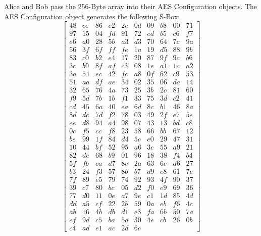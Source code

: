 \documentclass[journal]{IEEEtran}
\begin{document}
Alice and Bob pass the 256-Byte array into their AES Configuration objects. The AES Configuration object generates the following S-Box:
$$
\begin{bmatrix} 
48 & ce & 86 & e2 & 2e & 0d & 09 & b8 & 00 & 71 \\
97 & 15 & 04 & fd & 91 & 72 & ed & b5 & c6 & f7 \\
e6 & a0 & 28 & 5b & a3 & d3 & 70 & 64 & 7c & 9a \\
56 & 3f & 6f & ff & fe & 1a & 19 & d5 & 88 & 9b \\
83 & c0 & b2 & e4 & 17 & 20 & 87 & 9f & 9c & b6 \\
3c & b0 & 8f & af & c3 & 08 & 1e & a1 & 1c & a2 \\
3a & 54 & ec & 42 & fc & a8 & 0f & 62 & c9 & 53 \\
51 & aa & df & ae & 34 & 02 & 35 & 06 & da & 14 \\
32 & 65 & 76 & 4a & 73 & 25 & 3b & 2c & 81 & 60 \\
f9 & 5d & 7b & 1b & f1 & 33 & 75 & 3d & c2 & 41 \\
cd & 45 & 6a & 40 & ea & 6d & 8c & b1 & 46 & 8a \\
8d & dc & 7d & f2 & 78 & 03 & 49 & 2f & e7 & 5e \\
ee & d8 & 94 & a4 & 98 & 07 & 43 & 13 & bd & c8 \\
0c & f5 & cc & f8 & 23 & 58 & 66 & bb & 67 & 12 \\
be & 99 & 1f & 84 & d4 & 5c & e0 & 29 & 47 & 31 \\
10 & 44 & bf & 52 & 95 & a6 & 3e & 55 & a9 & 21 \\
82 & de & 68 & b9 & 01 & 96 & 18 & 38 & f4 & b4 \\
5f & fb & ca & d7 & 8e & 2a & 63 & 6e & d6 & 27 \\
b3 & 24 & f3 & 57 & 8b & b7 & d9 & e8 & 61 & 7e \\
7f & 89 & e5 & 79 & 74 & 92 & 93 & 4f & 90 & 37 \\
39 & c7 & 80 & bc & 05 & d2 & f0 & e9 & 69 & 36 \\
77 & d0 & 11 & 0e & a7 & 9e & c1 & 1d & 85 & 4d \\
dd & a5 & cf & 22 & 2b & 59 & 0a & eb & f6 & 4c \\
ab & 16 & 4b & db & d1 & e3 & fa & 6b & 50 & 7a \\
ef & 9d & c5 & ba & 5a & 30 & 4e & cb & 26 & 0b \\
c4 & ad & e1 & ac & 2d & 6c 
\end{bmatrix}
$$
\end{document}
